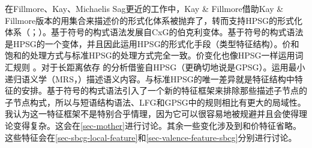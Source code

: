 在Fillmore、Kay、Michaelis \biband Sag更近的工作中，Kay \& Fillmore借助Kay \& Fillmore版本的用集合来描述价的形式化体系被抛弃了，转而支持HPSG的形式化体系（\citealp{Kay2005a,Michaelis2006a,Sag2012a}；\citealp*[--11]{SBK2012a}）。基于符号的构式语法发展自CxG的伯克利变体。基于符号的构式语法是HPSG的一个变体\citep[]{Sag2010b}，并且因此运用HPSG的形式化手段（类型特征结构）。价和饱和的处理方式与标准HPSG的处理方式完全一致。价变化也像HPSG一样运用词汇规则 \citep*[\S~2.3]{SBK2012a}。对于长距离依存  的分析借鉴自HPSG（更确切地说是GPSG\indexgpsgc）。运用最小递归语义学（MRS\indexmrsc，\citealp*{CFPS2005a}）描述语义内容。与标准HPSG的唯一差异就是特征结构中特征的安排。基于符号的构式语法引入了一个新的特征框架来排除那些描述子节点的子节点构式，所以与短语结构语法、LFG和GPSG中的规则相比有更大的局域性。我认为这一特征框架不是特别合乎情理，因为它可以很容易地被规避并且会使得理论变得复杂。这会在\ref{sec-mother}进行讨论。其余一些变化涉及到\localfc 和价特征省略。这些特征会在\ref{sec-sbcg-local-feature}和\ref{sec-valence-feature-sbcg}分别进行讨论。


